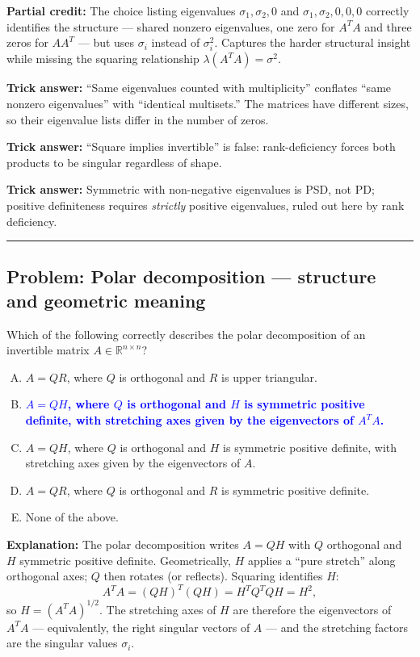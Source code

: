 \documentclass[12pt]{amsart}
\newcommand{\divider}{
  \vspace{-1em}
  \noindent
  \raisebox{-0.15ex}{\textbullet}%
  \hspace{0.5em}%
  \rule[0.5ex]{0.95\textwidth}{1.0pt}%
  \hspace{0.5em}%
  \raisebox{-0.15ex}{\textbullet}%
  \vspace{0em}
}
\begin{document}
\textbf{Partial credit:}
The choice listing eigenvalues $\sigma_1, \sigma_2, 0$ and $\sigma_1, \sigma_2, 0, 0, 0$
correctly identifies the structure --- shared nonzero eigenvalues, one zero
for $A^TA$ and three zeros for $AA^T$ --- but uses $\sigma_i$ instead of
$\sigma_i^2$. Captures the harder structural insight while missing the squaring
relationship $\lambda(A^TA) = \sigma^2$.

\textbf{Trick answer:}
``Same eigenvalues counted with multiplicity'' conflates ``same nonzero
eigenvalues'' with ``identical multisets.'' The matrices have different sizes,
so their eigenvalue lists differ in the number of zeros.

\textbf{Trick answer:}
``Square implies invertible'' is false: rank-deficiency forces both products
to be singular regardless of shape.

\textbf{Trick answer:}
Symmetric with non-negative eigenvalues is PSD, not PD; positive definiteness
requires \emph{strictly} positive eigenvalues, ruled out here by rank deficiency.

\divider

\subsection*{Problem: Polar decomposition --- structure and geometric meaning}

Which of the following correctly describes the polar decomposition of an
invertible matrix $A \in \mathbb{R}^{n \times n}$?

\begin{enumerate}[(A)]
\item $A = QR$, where $Q$ is orthogonal and $R$ is upper triangular.
\item \textcolor{blue}{\textbf{$A = QH$, where $Q$ is orthogonal and $H$ is symmetric positive definite, with stretching axes given by the eigenvectors of $A^TA$.}}
\item $A = QH$, where $Q$ is orthogonal and $H$ is symmetric positive definite,
with stretching axes given by the eigenvectors of $A$.
\item $A = QR$, where $Q$ is orthogonal and $R$ is symmetric positive definite.
\item None of the above.
\end{enumerate}

\textbf{Explanation:}
The polar decomposition writes $A = QH$ with $Q$ orthogonal and $H$ symmetric
positive definite. Geometrically, $H$ applies a ``pure stretch'' along orthogonal
axes; $Q$ then rotates (or reflects). Squaring identifies $H$:
$$A^TA = (QH)^T(QH) = H^T Q^T Q H = H^2,$$
so $H = (A^TA)^{1/2}$. The stretching axes of $H$ are therefore the eigenvectors
of $A^TA$ --- equivalently, the right singular vectors of $A$ --- and the
stretching factors are the singular values $\sigma_i$.
\end{document}
